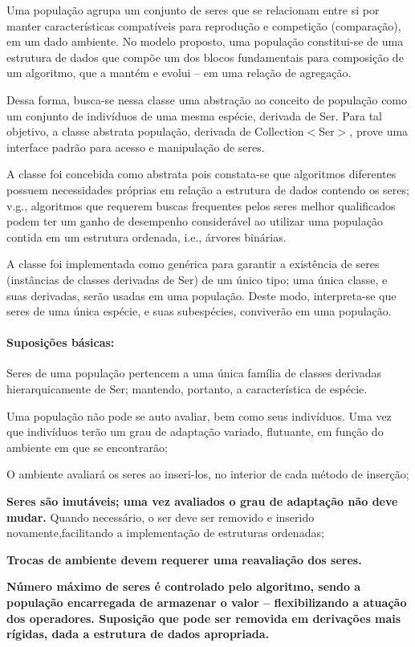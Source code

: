 Uma população agrupa um conjunto de seres que se relacionam entre si por manter características compatíveis para reprodução e competição (comparação), em um dado ambiente. No modelo proposto, uma população constitui-\/se de uma estrutura de dados que compõe um dos blocos fundamentais para composição de um algoritmo, que a mantém e evolui – em uma relação de agregação. 

Dessa forma, busca-\/se nessa classe uma abstração ao conceito de população como um conjunto de indivíduos de uma mesma espécie, derivada de Ser. Para tal objetivo, a classe abstrata população, derivada de {\ttfamily Collection$<$Ser$>$}, prove uma interface padrão para acesso e manipulação de seres. 

A classe foi concebida como abstrata pois constata-\/se que algoritmos diferentes possuem necessidades próprias em relação a estrutura de dados contendo os seres; v.\-g., algoritmos que requerem buscas frequentes pelos seres melhor qualificados podem ter um ganho de desempenho considerável ao utilizar uma população contida em um estrutura ordenada, i.\-e., árvores binárias. 

A classe foi implementada como genérica para garantir a existência de seres (instâncias de classes derivadas de {\ttfamily Ser}) de um único tipo; uma única classe, e suas derivadas, serão usadas em uma população. Deste modo, interpreta-\/se que seres de uma única espécie, e suas subespécies, conviverão em uma população. 

\paragraph*{Suposições básicas\-:}


\begin{DoxyItemize}
\item Seres de uma população pertencem a uma única família de classes derivadas hierarquicamente de {\ttfamily Ser}; mantendo, portanto, a característica de espécie.  
\item Uma {\ttfamily população} não pode se auto avaliar, bem como seus indivíduos. Uma vez que indivíduos terão um grau de adaptação variado, flutuante, em função do ambiente em que se encontrarão;  
\item O ambiente avaliará os seres ao inseri-\/los, no interior de cada método de inserção; 
\item {\bfseries Seres são imutáveis; uma vez avaliados o grau de adaptação não deve mudar.} Quando necessário, o ser deve ser removido e inserido novamente,facilitando a implementação de estruturas ordenadas; 
\item {\bfseries Trocas de ambiente devem requerer uma reavaliação dos seres.} 
\item {\bfseries Número máximo de seres é controlado pelo algoritmo, sendo a população encarregada de armazenar o valor – flexibilizando a atuação dos operadores. Suposição que pode ser removida em derivações mais rígidas, dada a estrutura de dados apropriada.} 
\end{DoxyItemize}

